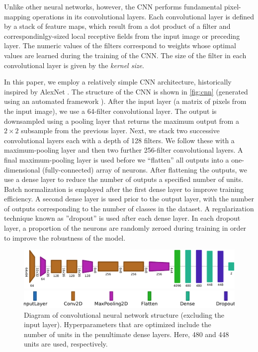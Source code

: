 \documentclass[NewProceedindgs, NoLineNumbers, SectionNumbers, letterpaper, SingleSpace, InsideFigs]{ascelike-new}
\begin{document}
Unlike other neural networks, however, the CNN performs fundamental pixel-mapping operations in its convolutional
layers. Each convolutional layer is defined by a stack of feature maps, which result from a dot product of a filter and
correspondinlgy-sized local receptive fields from the input image or preceding layer.  The numeric values of the filters
correspond to weights whose optimal values are learned during the training of the CNN.  The size of the filter in each
convolutional layer is given by the \textit{kernel size}.

In this paper, we employ a relatively simple CNN architecture, historically inspired by AlexNet \cite{krizhevsky2012imageneta}.
The structure of the CNN is shown in \autoref{fig:cnn} (generated using an automated  framework \cite{bauerle2021net2vis}).
After the input layer (a matrix of pixels from the input image), we use a 64-filter convolutional layer.
The output is downsampled using a pooling layer that returns the maximum output from a $2\times 2$ subsample from the previous layer.
Next, we stack two successive convolutional layers each with a depth of 128 filters.
We follow these with a maximum-pooling layer and then two further 256-filter convolutional layers.
A final maximum-pooling layer is used before we ``flatten'' all outputs into a one-dimensional (fully-connected) array of neurons. 
After flattening the outputs, we use a dense layer to reduce the number of outputs a specified number of units.
Batch normalization \cite{ioffe2015batch} is employed after the first dense layer to improve training efficiency.
A second dense layer is used prior to the output layer, with the number of outputs corresponding to the number of classes in the dataset.
A regularization technique known as ''dropout'' is used after each dense layer.
In each dropout layer, a proportion of the neurons are randomly zeroed during training in order to improve the robustness of the model.
\begin{figure}
    \centering
    \includegraphics[width=.9\textwidth]{net2vis/graph.pdf}
    
    \bigskip
    
    \includegraphics[width=.5\textwidth, trim={4cm 0 0 0}, clip]{figures/net2vis-name-labels/legend}
    \caption{Diagram of convolutional neural network structure (excluding the input layer). Hyperparameters that are
      optimized include the number of units in the penultimate dense layers. Here, 480 and 448 units are used, respectively.}
    \label{fig:cnn}
\end{figure}
\end{document}
